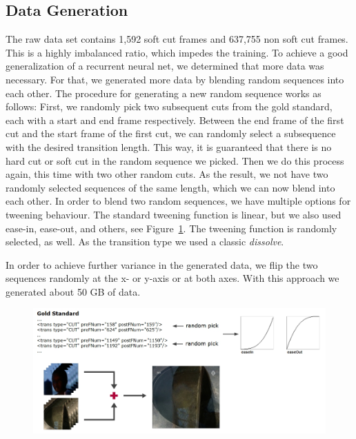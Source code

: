 \subsection{Data Generation}
\label{sec:soft_cut_data_generation}

The raw data set contains 1,592 soft cut frames and 637,755 non soft cut frames.
This is a highly imbalanced ratio, which impedes the training.
To achieve a good generalization of a recurrent neural net, we determined that more data was necessary.
For that, we generated more data by blending random sequences into each other.
The procedure for generating a new random sequence works as follows:
First, we randomly pick two subsequent cuts from the gold standard, each with a start and end frame respectively.
Between the end frame of the first cut and the start frame of the first cut, we can randomly select a subsequence with the desired transition length.
This way, it is guaranteed that there is no hard cut or soft cut in the random sequence we picked.
Then we do this process again, this time with two other random cuts.
As the result, we not have two randomly selected sequences of the same length, which we can now blend into each other.
In order to blend two random sequences, we have multiple options for tweening behaviour.
The standard tweening function is linear, but we also used ease-in, ease-out, and others, see Figure~\ref{fig:data_generation}.
The tweening function is randomly selected, as well.
As the transition type we used a classic \textit{dissolve}.

In order to achieve further variance in the generated data, we flip the two sequences randomly at the x- or y-axis or at both axes.
With this approach we generated about 50 GB of data.

\begin{figure}
    \centering
    \includegraphics[scale=.5]{images/data_generation.jpg}
    \caption{}
    \label{fig:data_generation}
\end{figure}
